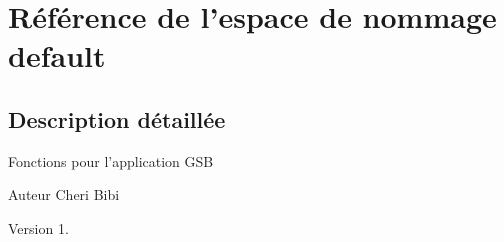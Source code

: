 \hypertarget{namespacedefault}{\section{Référence de l'espace de nommage default}
\label{namespacedefault}
}


\subsection{Description détaillée}
Fonctions pour l'application G\-S\-B

\begin{DoxyAuthor}{Auteur}
Cheri Bibi 
\end{DoxyAuthor}
\begin{DoxyVersion}{Version}
1. 
\end{DoxyVersion}
